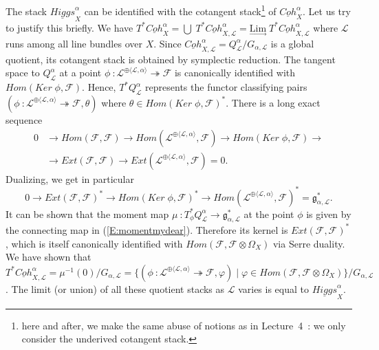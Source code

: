\documentclass[a4paper,10pt]{amsart}
\def\tto{\twoheadrightarrow}
\def\a{\alpha}
\numberwithin{equation}{section}
\begin{document}
The stack $\underline{Higgs}^{\a}_X$ can be identified  with the cotangent stack\footnote{here and after, we make the same abuse of notions as in Lecture~4~: we only consider the underived cotangent stack.} of $\underline{Coh}^{\a}_X$. Let us try to justify this briefly. We have $T^*\underline{Coh}^{\a}_X = \bigcup\;  T^*\underline{Coh}^{\a}_{X,\mathcal{L}}= \underset{\longrightarrow}{\text{Lim}}\; T^*\underline{Coh}^{\a}_{X,\mathcal{L}}$ where $\mathcal{L}$ runs among all line bundles over $X$. Since $\underline{Coh}^{\a}_{X,\mathcal{L}}=Q^{\a}_{\mathcal{L}}/G_{\a,\mathcal{L}}$ is a global quotient, its cotangent stack is obtained by symplectic reduction. The tangent space to $Q^{\a}_{\mathcal{L}}$ at a point $\phi~:\mathcal{L}^{\oplus \langle \mathcal{L},\a\rangle} \tto \mathcal{F}$ is canonically identified with $Hom(Ker\;\phi, \mathcal{F})$. Hence, $T^*Q^{\a}_{\mathcal{L}}$ represents the functor classifying pairs $(\phi~:\mathcal{L}^{\oplus \langle \mathcal{L},\a\rangle} \tto \mathcal{F}, \theta)$ where $\theta \in Hom(Ker\;\phi,\mathcal{F})^*$.
There is a long exact sequence
\begin{align*}
0 &\longrightarrow Hom(\mathcal{F},\mathcal{F}) \longrightarrow Hom(\mathcal{L}^{\oplus \langle \mathcal{L},\a\rangle}, \mathcal{F}) \longrightarrow Hom(Ker\;\phi, \mathcal{F}) \longrightarrow \\
 &\longrightarrow Ext(\mathcal{F}, \mathcal{F}) \longrightarrow Ext(\mathcal{L}^{\oplus \langle \mathcal{L},\a\rangle}, \mathcal{F})=0.
 \end{align*}
Dualizing, we get in particular
\begin{equation}\label{E:momentmydear}
0 \longrightarrow Ext(\mathcal{F},\mathcal{F})^* \longrightarrow  Hom(Ker\;\phi, \mathcal{F})^* \longrightarrow Hom(\mathcal{L}^{\oplus \langle \mathcal{L},\a\rangle}, \mathcal{F})^* =\mathfrak{g}_{\a,\mathcal{L}}^*.
\end{equation}
It can be shown that the moment map $\mu~: T^*_{\phi}Q^{\a}_{\mathcal{L}} \to \mathfrak{g}_{\a,\mathcal{L}}^*$ at the point $\phi$ is given by the connecting map in 
(\ref{E:momentmydear}). Therefore its kernel is $Ext(\mathcal{F},\mathcal{F})^*$, which is itself canonically identified with $Hom(\mathcal{F},\mathcal{F}\otimes \Omega_X)$ via Serre duality. We have shown that
$T^* \underline{Coh}^{\a}_{X,\mathcal{L}}=\mu^{-1}(0)/G_{\a,\mathcal{L}}=\big\{(\phi~:\mathcal{L}^{\oplus \langle \mathcal{L},\a\rangle} \tto \mathcal{F}, \varphi)\;|\; \varphi \in Hom(\mathcal{F},\mathcal{F}\otimes \Omega_X)\big\}/G_{\a,\mathcal{L}}$. The limit (or union) of all these quotient stacks as $\mathcal{L}$ varies is equal to $\underline{Higgs}^{\a}_X$.
\end{document}
